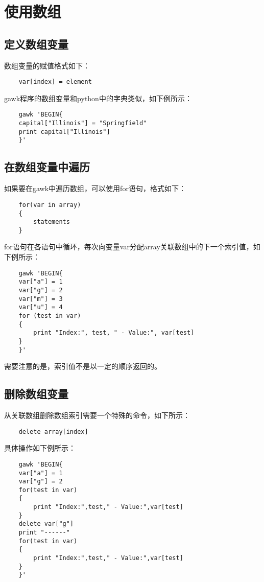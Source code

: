 \documentclass[a4paper,left=2.5cm,right=2.5cm,11pt]{article}
\begin{document}
\section{使用数组}
\subsection{定义数组变量}
	数组变量的赋值格式如下：
	\begin{lstlisting}
	var[index] = element
	\end{lstlisting}

	gawk程序的数组变量和python中的字典类似，如下例所示：
	\begin{lstlisting}
	gawk 'BEGIN{
	capital["Illinois"] = "Springfield"
	print capital["Illinois"]
	}'
	\end{lstlisting}

\subsection{在数组变量中遍历}
	如果要在gawk中遍历数组，可以使用for语句，格式如下：
	\begin{lstlisting}
	for(var in array)
	{
		statements
	}
	\end{lstlisting}

	for语句在各语句中循环，每次向变量var分配array关联数组中的下一个索引值，如下例所示：
	\begin{lstlisting}
	gawk 'BEGIN{
	var["a"] = 1
	var["g"] = 2
	var["m"] = 3
	var["u"] = 4
	for (test in var)
	{
		print "Index:", test, " - Value:", var[test]
	}
	}'
	\end{lstlisting}

	需要注意的是，索引值不是以一定的顺序返回的。

\subsection{删除数组变量}
	从关联数组删除数组索引需要一个特殊的命令，如下所示：
	\begin{lstlisting}
	delete array[index]
	\end{lstlisting}

	具体操作如下例所示：
	\begin{lstlisting}
	gawk 'BEGIN{
	var["a"] = 1
	var["g"] = 2
	for(test in var)
	{
		print "Index:",test," - Value:",var[test]
	}
	delete var["g"]
	print "------"
	for(test in var)
	{
		print "Index:",test," - Value:",var[test]
	}
	}'
	\end{lstlisting}
\end{document}
